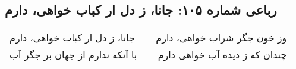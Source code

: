 \begin{center}
\section*{رباعی شماره ۱۰۵: جانا، ز دل ار کباب خواهی، دارم}
\label{sec:105}
\begin{longtable}{l p{0.5cm} r}
جانا، ز دل ار کباب خواهی، دارم
&&
وز خون جگر شراب خواهی، دارم
\\
با آنکه ندارم از جهان بر جگر آب
&&
چندان که ز دیده آب خواهی دارم
\\
\end{longtable}
\end{center}
